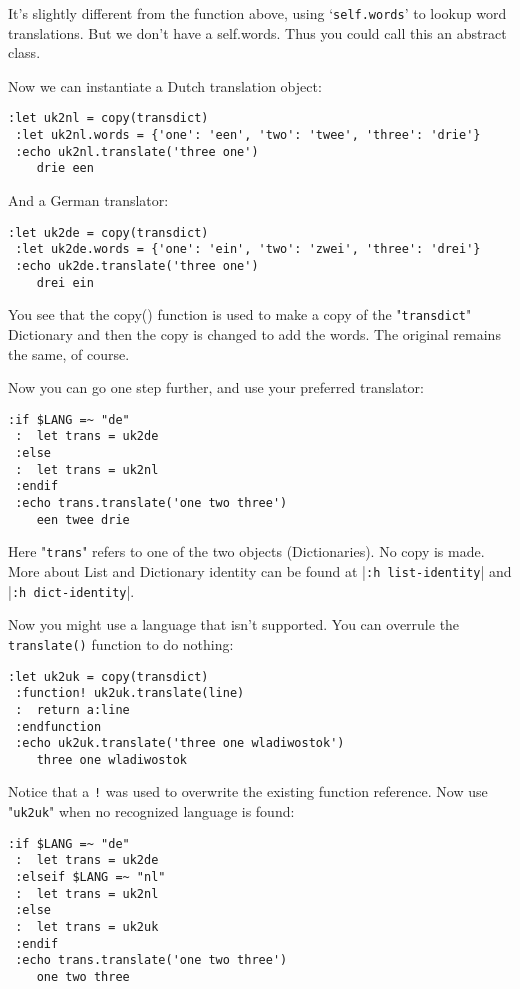 It's slightly different from the function above, using `\verb!self.words!' to lookup word translations.
But we don't have a self.words.
Thus you could call this an abstract class.

Now we can instantiate a Dutch translation object:

\begin{Verbatim}[samepage=true]
 :let uk2nl = copy(transdict)
 :let uk2nl.words = {'one': 'een', 'two': 'twee', 'three': 'drie'}
 :echo uk2nl.translate('three one')
    drie een
\end{Verbatim}

And a German translator:

\begin{Verbatim}[samepage=true]
 :let uk2de = copy(transdict)
 :let uk2de.words = {'one': 'ein', 'two': 'zwei', 'three': 'drei'}
 :echo uk2de.translate('three one')
    drei ein
\end{Verbatim}

You see that the copy() function is used to make a copy of the "\verb!transdict!" Dictionary and then the copy is changed to add the words.
The original remains the same, of course.

Now you can go one step further, and use your preferred translator:

\begin{Verbatim}[samepage=true]
 :if $LANG =~ "de"
 :  let trans = uk2de
 :else
 :  let trans = uk2nl
 :endif
 :echo trans.translate('one two three')
    een twee drie
\end{Verbatim}

Here "\verb!trans!" refers to one of the two objects (Dictionaries).
No copy is made.
More about List and Dictionary identity can be found at |\verb!:h list-identity!| and |\verb!:h dict-identity!|.

Now you might use a language that isn't supported.
You can overrule the \verb!translate()! function to do nothing:

\begin{Verbatim}[samepage=true]
 :let uk2uk = copy(transdict)
 :function! uk2uk.translate(line)
 :  return a:line
 :endfunction
 :echo uk2uk.translate('three one wladiwostok')
    three one wladiwostok
\end{Verbatim}

Notice that a \verb:!: was used to overwrite the existing function reference.
Now use "\verb!uk2uk!" when no recognized language is found:

\begin{Verbatim}[samepage=true]
 :if $LANG =~ "de"
 :  let trans = uk2de
 :elseif $LANG =~ "nl"
 :  let trans = uk2nl
 :else
 :  let trans = uk2uk
 :endif
 :echo trans.translate('one two three')
    one two three
\end{Verbatim}

